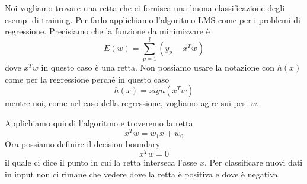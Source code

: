 Noi vogliamo trovare una retta che ci fornisca una buona classificazione degli esempi di training. Per farlo applichiamo
l'algoritmo LMS come per i problemi di regressione. Precisiamo che la funzione da minimizzare \`e
\[ E(w) = \sum_{p = 1}^l (y_p - x^T w) \]
dove $x^T w$ in questo caso \`e una retta. Non possiamo usare la notazione con $h(x)$ come per la regressione perch\'e
in questo caso
\[ h(x) = sign(x^T w) \]
mentre noi, come nel caso della regressione, vogliamo agire sui pesi $w$.

Applichiamo quindi l'algoritmo e troveremo la retta
\[ x^T w = w_1 x + w_0 \]
Ora possiamo definire il decision boundary
\[ x^T w = 0 \]
il quale ci dice il punto in cui la retta interseca l'asse $x$. Per classificare nuovi dati in input non ci rimane che
vedere dove la retta \`e positiva e dove \`e negativa.
